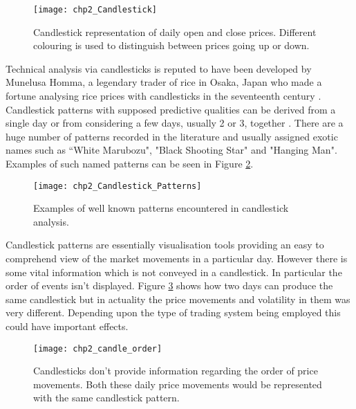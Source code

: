 \begin{figure}[tbph!]
\centering
\texttt{[image: chp2\_Candlestick]}
\caption[Candlestick representation of daily open and close prices]{Candlestick representation of daily open and close prices. Different colouring is used to distinguish between prices going up or down.}
\label{fig:Candlestick}
\end{figure}

Technical analysis via candlesticks is reputed to have been developed by Munelusa Homma, a legendary trader of rice in Osaka, Japan who made a fortune analysing rice prices with candlesticks in the seventeenth century \citep{nison2001japanese}. Candlestick patterns with supposed predictive qualities can be derived from a single day or from considering a few days, usually 2 or 3, together \citep{bigalow2011profitable}. There are a huge number of patterns recorded in the literature and usually assigned exotic names such as \textquotedblleft White Marubozu", "Black Shooting Star" and "Hanging Man". Examples of such named patterns can be seen in Figure \ref{fig:Candlestick_Patterns}.

\begin{figure}[tbph!]
\centering
\texttt{[image: chp2\_Candlestick\_Patterns]}
\caption[Examples of well known candlestick patterns]{Examples of well known patterns encountered in candlestick analysis.}
\label{fig:Candlestick_Patterns}
\end{figure}

Candlestick patterns are essentially visualisation tools providing an easy to comprehend view of the market movements in a particular day. However there is some vital information which is not conveyed in a candlestick. In particular the order of events isn't displayed. Figure \ref{fig:chp2_candle_order} shows how two days can produce the same candlestick but in actuality the price movements and volatility in them was very different. Depending upon the type of trading system being employed this could have important effects.

\begin{figure}[tbph!]
\centering
\texttt{[image: chp2\_candle\_order]}
\caption[Candlesticks and market movement]{Candlesticks don't provide information regarding the order of price movements. Both these daily price movements would be represented with the same candlestick pattern.}
\label{fig:chp2_candle_order}
\end{figure}

